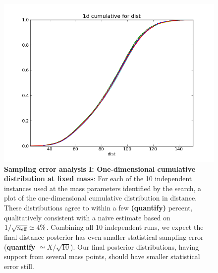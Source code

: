\documentclass[twocolumn,prd,nofootinbib]{revtex4}
\begin{document}
\begin{figure}
\includegraphics[width=\columnwidth]{../Figures/v2runs_coinc_id_833_cumulative-multiplot-distance-MASS_SET_0}
\caption{\label{fig:FiducialEvent:Cumulatives:Comparison:TriggerMasses}\textbf{Sampling error analysis I: One-dimensional cumulative distribution at fixed mass}:  For each of the 10 independent
  instances used at  the mass  parameters   identified by the search, a plot of the one-dimensional cumulative
  distribution in distance.  These distributions agree to within a few \textbf{(quantify)} percent, qualitatively
  consistent with a naive estimate based on $1/\sqrt{n_{\rm eff}} \simeq 4\%$.   Combining all 10
  independent runs, we expect the final distance posterior has even smaller statistical sampling error
  (\textbf{quantify} $\simeq X/\sqrt{10}$).  Our final posterior
  distributions, having support from several mass points, should have smaller statistical error still.
}
\end{figure}
\end{document}

